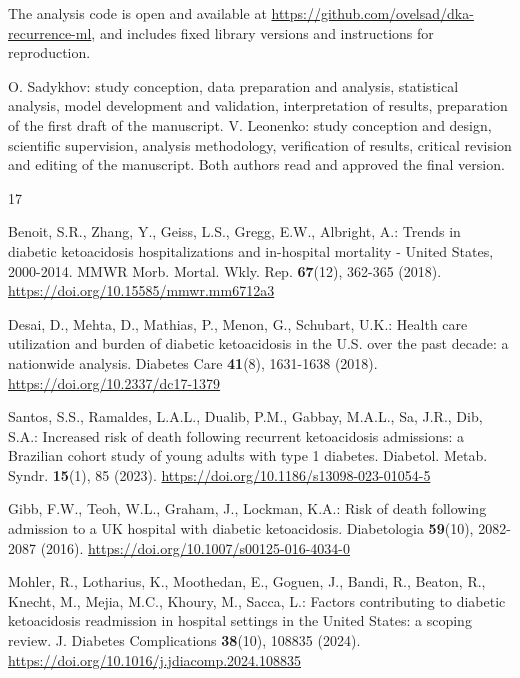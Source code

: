 \documentclass[pdflatex,sn-basic,Numbered]{sn-jnl}
\begin{document}

The analysis code is open and available at \url{https://github.com/ovelsad/dka-recurrence-ml}, and includes fixed library versions and instructions for reproduction.


O. Sadykhov: study conception, data preparation and analysis, statistical analysis, model development and validation, interpretation of results, preparation of the first draft of the manuscript. V. Leonenko: study conception and design, scientific supervision, analysis methodology, verification of results, critical revision and editing of the manuscript. Both authors read and approved the final version.

\begin{thebibliography}{17}

 Benoit, S.R., Zhang, Y., Geiss, L.S., Gregg, E.W., Albright, A.: Trends in diabetic ketoacidosis hospitalizations and in-hospital mortality - United States, 2000-2014. MMWR Morb. Mortal. Wkly. Rep. \textbf{67}(12), 362-365 (2018). \url{https://doi.org/10.15585/mmwr.mm6712a3}

 Desai, D., Mehta, D., Mathias, P., Menon, G., Schubart, U.K.: Health care utilization and burden of diabetic ketoacidosis in the U.S. over the past decade: a nationwide analysis. Diabetes Care \textbf{41}(8), 1631-1638 (2018). \url{https://doi.org/10.2337/dc17-1379}

 Santos, S.S., Ramaldes, L.A.L., Dualib, P.M., Gabbay, M.A.L., Sa, J.R., Dib, S.A.: Increased risk of death following recurrent ketoacidosis admissions: a Brazilian cohort study of young adults with type 1 diabetes. Diabetol. Metab. Syndr. \textbf{15}(1), 85 (2023). \url{https://doi.org/10.1186/s13098-023-01054-5}

 Gibb, F.W., Teoh, W.L., Graham, J., Lockman, K.A.: Risk of death following admission to a UK hospital with diabetic ketoacidosis. Diabetologia \textbf{59}(10), 2082-2087 (2016). \url{https://doi.org/10.1007/s00125-016-4034-0}

 Mohler, R., Lotharius, K., Moothedan, E., Goguen, J., Bandi, R., Beaton, R., Knecht, M., Mejia, M.C., Khoury, M., Sacca, L.: Factors contributing to diabetic ketoacidosis readmission in hospital settings in the United States: a scoping review. J. Diabetes Complications \textbf{38}(10), 108835 (2024). \url{https://doi.org/10.1016/j.jdiacomp.2024.108835}


\end{thebibliography}
\end{document}
